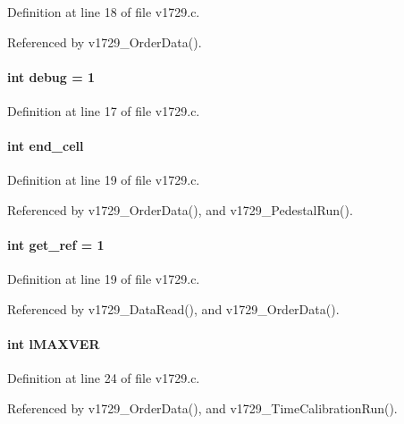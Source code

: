 Definition at line 18 of file v1729.c.

Referenced by v1729\_\-OrderData().
\paragraph[{debug}]{\setlength{\rightskip}{0pt plus 5cm}int {\bf debug} = 1}\hfill\label{v1729_8c_ac3e1795766a80ec63b157951b4b9a7d4}


Definition at line 17 of file v1729.c.
\paragraph[{end\_\-cell}]{\setlength{\rightskip}{0pt plus 5cm}int {\bf end\_\-cell}}\hfill\label{v1729_8c_a3aa5e48b93f32dfbc149b824eec93ce1}


Definition at line 19 of file v1729.c.

Referenced by v1729\_\-OrderData(), and v1729\_\-PedestalRun().
\paragraph[{get\_\-ref}]{\setlength{\rightskip}{0pt plus 5cm}int {\bf get\_\-ref} = 1}\hfill\label{v1729_8c_aed343565c15b922d5f4dd0efac2d4048}


Definition at line 19 of file v1729.c.

Referenced by v1729\_\-DataRead(), and v1729\_\-OrderData().
\paragraph[{lMAXVER}]{\setlength{\rightskip}{0pt plus 5cm}int {\bf lMAXVER}}\hfill\label{v1729_8c_a4c4d058e715c2598ce323a692a157faa}


Definition at line 24 of file v1729.c.

Referenced by v1729\_\-OrderData(), and v1729\_\-TimeCalibrationRun().
